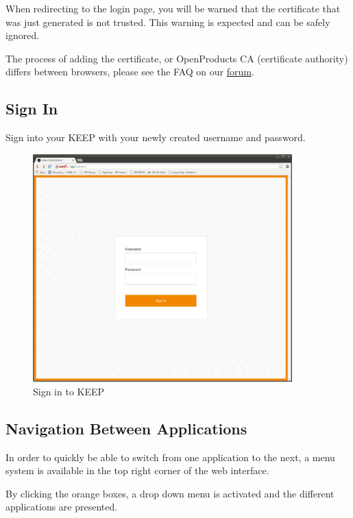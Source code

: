 \documentclass[12pt,a4paper,titlepage]{article}
\begin{document}
When redirecting to the login page, you will be warned that the certificate that was just generated is not trusted. This warning is expected and can be safely ignored.

The process of adding the certificate, or OpenProducts CA (certificate authority) differs between browsers, please see the FAQ on our  \href{http://community.openproducts.com}{forum}. 

\newpage
\subsection{Sign In}
Sign into your KEEP with your newly created username and password. 
\begin{figure}[h!]
\centering
\includegraphics[width=10cm]{./img/sign-in}
\caption{Sign in to KEEP}
\end{figure}

\newpage
\subsection{Navigation Between Applications}
In order to quickly be able to switch from one application to the next, a menu system is available in the top right corner of the web interface.

By clicking the orange boxes, a drop down menu is activated and the different applications are presented. 
\end{document}
